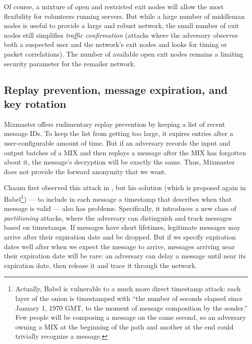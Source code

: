 \documentclass{llncs}
\begin{document}
Of course, a mixture of open and restricted exit nodes will allow the
most flexibility for volunteers running servers. But while a large number
of middleman nodes is useful to provide a large and robust network, the
small number of exit nodes still simplifies \emph{traffic confirmation}
(attacks where the adversary observes both a suspected user and the
network's exit nodes and looks for timing or packet correlations). The
number of available open exit nodes remains a limiting security parameter
for the remailer network.

\subsection{Replay prevention, message expiration, and key rotation}

Mixmaster offers rudimentary replay prevention by keeping a list of recent
message IDs. To keep the list from getting too large, it expires entries
after a user-configurable amount of time. But if an adversary records
the input and output batches of a MIX and then replays a message after
the MIX has forgotten about it, the message's decryption will be exactly
the same. Thus, Mixmaster does not provide the forward anonymity that we want.

Chaum first observed this attack in \cite{chaum-mix},
but his solution (which is proposed again in Babel\footnote{
  Actually, Babel is vulnerable to a much more direct timestamp attack:
  each layer of the onion is timestamped with ``the number of seconds
  elapsed since January 1, 1970 GMT, to the moment of message composition
  by the sender.'' Few people will be composing a message on the same
  second, so an adversary owning a MIX at the beginning of the path and
  another at the end could trivially recognize a message.
}) --- to include in each message a timestamp that describes when that message
is valid --- also has problems. Specifically, it introduces a new class
of \emph{partitioning} attacks, where the adversary can distinguish and
track messages based on timestamps. If messages have short lifetimes,
legitimate messages may arrive after their expiration date and be
dropped. But if we specify expiration dates well after when we expect the
message to arrive, messages arriving near their expiration date will be
rare: an adversary can delay a message until near its expiration date,
then release it and trace it through the network.

\end{document}
